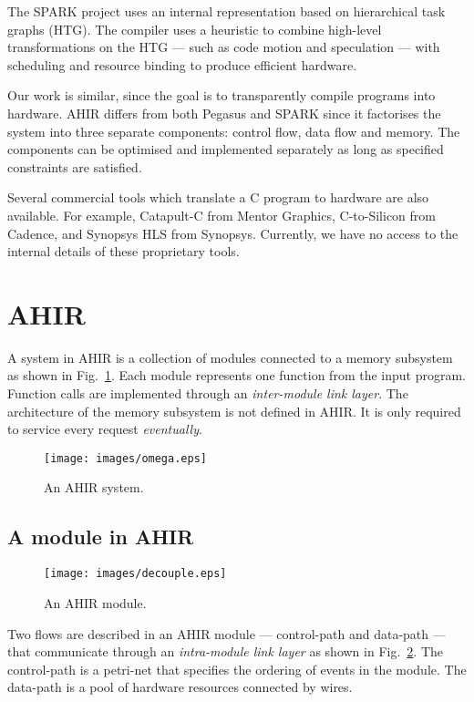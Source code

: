 \documentclass[conference]{IEEEtran}
\begin{document}
The SPARK\cite{spark-vlsi-paper} project uses an internal
representation based on hierarchical task graphs (HTG). The compiler
uses a heuristic to combine high-level transformations on the HTG ---
such as code motion and speculation\cite{spark-code-motion} --- with
scheduling and resource binding to produce efficient hardware.

Our work is similar, since the goal is to transparently compile
programs into hardware. AHIR differs from both Pegasus and SPARK since
it factorises the system into three separate components: control flow,
data flow and memory.  The components can be optimised and
implemented separately as long as specified constraints are satisfied.

Several commercial tools which translate a C program to hardware are
also available.  For example, Catapult-C \cite{catapult-c} from
Mentor Graphics, C-to-Silicon \cite{c-to-silicon} from Cadence,
and Synopsys HLS \cite{synopsys-hls} from Synopsys.  Currently,
we have no access to the internal details of these proprietary tools.


\section{AHIR}

A system in AHIR is a collection of modules connected to a memory
subsystem as shown in Fig.~\ref{fig:system}. Each module represents
one function from the input program. Function calls are implemented
through an \emph{inter-module link layer}. The architecture of the
memory subsystem is not defined in AHIR. It is only required to
service every request \emph{eventually}.

\begin{figure}[!t]
  \centering
  \texttt{[image: images/omega.eps]}
  \caption{An AHIR system.}
  \label{fig:system}
\end{figure}

\subsection{A module in AHIR}


\begin{figure}[!t]
  \centering
  \texttt{[image: images/decouple.eps]}
  \caption{An AHIR module.}
  \label{fig:decouple}
\end{figure}

Two flows are described in an AHIR module --- control-path and
data-path --- that communicate through an \emph{intra-module link
  layer} as shown in Fig.~\ref{fig:decouple}. The control-path is a
petri-net that specifies the ordering of events in the module. The
data-path is a pool of hardware resources connected by wires.
\end{document}
